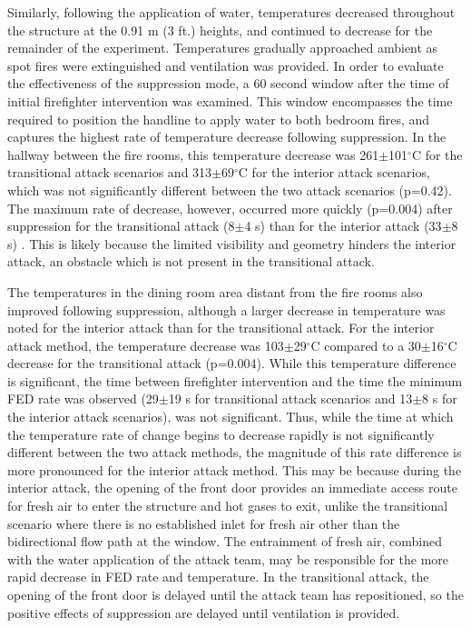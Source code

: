 \documentclass[12pt,oneside]{article}
\begin{document}
Similarly, following the application of water, temperatures decreased throughout the structure at the 0.91 m (3 ft.) heights, and continued to decrease for the remainder of the experiment. Temperatures gradually approached ambient as spot fires were extinguished and ventilation was provided. In order to evaluate the effectiveness of the suppression mode, a 60 second window after the time of initial firefighter intervention was examined. This window encompasses the time required to position the handline to apply water to both bedroom fires, and captures the highest rate of temperature decrease following suppression. In the hallway between the fire rooms, this temperature decrease was 261$\pm$101$^{\circ}$C for the transitional attack scenarios and 313$\pm$69$^{\circ}$C for the interior attack scenarios, which was not significantly different between the two attack scenarios (p=0.42). The maximum rate of decrease, however, occurred more quickly (p=0.004) after suppression for the transitional attack (8$\pm$4 s) than for the interior attack (33$\pm$8 s) . This is likely because the limited visibility and geometry hinders the interior attack, an obstacle which is not present in the transitional attack. 

The temperatures in  the dining room area distant from the fire rooms also improved following suppression, although a larger decrease in temperature was noted for the interior attack than for the transitional attack. For the interior attack method, the temperature decrease was 103$\pm$29$^{\circ}$C compared to a 30$\pm$16$^{\circ}$C decrease for the transitional attack (p=0.004). While this temperature difference is significant, the time between firefighter intervention and the time the minimum FED rate was observed (29$\pm$19 s for transitional attack scenarios and 13$\pm$8 s for the interior attack scenarios), was not significant. Thus, while the time at which the temperature rate of change begins to decrease rapidly is not significantly different between the two attack methods, the magnitude of this rate difference is more pronounced for the interior attack method. This may be because during the interior attack, the opening of the front door provides an immediate access route for fresh air to enter the structure and hot gases to exit, unlike the transitional scenario where there is no established inlet for fresh air other than the bidirectional flow path at the window. The entrainment of fresh air, combined with the water application of the attack team, may be responsible for the more rapid decrease in FED rate and temperature. In the transitional attack, the opening of the front door is delayed until the attack team has repositioned, so the positive effects of suppression are delayed until ventilation is provided.
\end{document}
